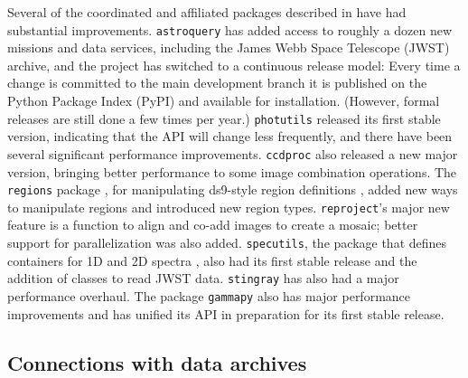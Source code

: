 \documentclass[modern]{aastex631}
\newcommand{\secauthor}[1]{{\color{blue}Author:~\textit{#1}}}
\begin{document}
Several of the coordinated and affiliated packages described in
\cite{astropy:2018} have had substantial improvements. \texttt{astroquery}
\citep{astroquery} has added access to roughly a dozen new missions and data
services, including the James Webb Space Telescope (JWST) archive, and the
project has switched to a continuous release model: Every time a change is
committed to the main development branch it is published on the Python Package
Index (PyPI) and available for installation. (However, formal releases are still
done a few times per year.) \texttt{photutils} \cite {photutils} released its
first stable version, indicating that the API will change less frequently, and
there have been several significant performance improvements. \texttt{ccdproc}
\cite{ccdproc} also released a new major version, bringing better performance to
some image combination operations. The \texttt{regions} package
\cite{pyregions}, for manipulating ds9-style region definitions \cite{ds9},
added new ways to manipulate regions and introduced new region types.
\texttt{reproject}'s \cite{reproject} major new feature is a function to align
and co-add images to create a mosaic; better support for parallelization was
also added. \texttt{specutils}, the package that defines containers for 1D and
2D spectra \cite{specutils}, also had its first stable release and the addition
of classes to read JWST data. \texttt{stingray} has also had a major performance
overhaul. The package \texttt{gammapy} \cite{gammapy} also has major performance
improvements and has unified its API in preparation for its first stable
release.

\subsection{Connections with data archives}
\label{sec:astroquery}

\end{document}
